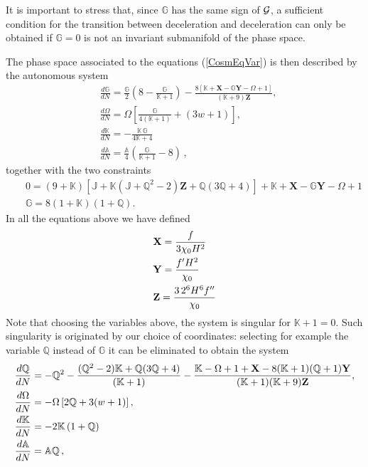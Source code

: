 \documentclass[a4paper,aps,onecolumn,nofootinbib]{revtex4}
\def\rf#1{(\ref{#1})}
\def\DerN#1{\frac{d #1}{d N}}
\def\G{{\cal G}}
\begin{document}
It is important to stress that, since $\mathbb{G}$ has the same sign of $\G$, a sufficient condition for the transition between deceleration and deceleration can only be obtained if $\mathbb{G}=0$ is not an invariant submanifold of the phase space.

The phase space associated to the equations \rf{CosmEqVar} is then described by the autonomous system
\begin{equation}\label{DynSys}
\begin{split}
&\DerN{\mathbb{G}}= \frac{\mathbb{G}}{2}  \left(8-\frac{\mathbb{G}}{\mathbb{K}+1}\right)-\frac{8
   [\mathbb{K}+\mathbf{X}-\mathbb{G} \mathbf{Y}-\Omega +1]}{(\mathbb{K}+9) \mathbf{Z}},\\ 
&\DerN{\Omega} =\Omega  \left[\frac{\mathbb{G}}{4 (\mathbb{K}+1)}+(3 w+1)\right],\\ 
&\DerN{\mathbb{K} }=-\frac{\mathbb{K}\, \mathbb{G} }{4
   \mathbb{K}+4}\\
&\DerN{\mathbb{A}}=\frac{\mathbb{A}}{4}  \left(\frac{\mathbb{G}}{\mathbb{K}+1}-8\right)\,,
\end{split}
\end{equation}
together with the two constraints
\begin{eqnarray}
&& 0=(9+\mathbb{K}) \left[\mathbb{J}+\mathbb{K}
   \left(\mathbb{J}+\mathbb{Q}^2-2\right)\mathbf{Z}+\mathbb{Q} (3
   \mathbb{Q}+4)\right]+\mathbb{K}+\mathbf{X}-\mathbb{G} \mathbf{Y}-\Omega +1  \label{FriedConstr} \\
&&  \mathbb{G}=8(1+\mathbb{\mathbb{K}})(1+\mathbb{Q}).\label{GB Constr}
\end{eqnarray}
 In all the equations above we have defined
\begin{align} \label{XYT}
& {\bf X}= \frac{f}{3 \chi_0 H^2 }\\
&  {\bf Y}= \frac{f' H^2}{\chi_0}\\
& {\bf Z}= \frac{3\, 2^6 H^6  f''}{ \chi_0}
\end{align}
Note that choosing the variables above, the system is singular for $\mathbb{K}+1=0$. Such singularity is originated by our choice of coordinates:  selecting for example the variable $\mathbb{Q}$ instead of $\mathbb{G}$ it can be eliminated to obtain the system
\begin{equation}\label{DynSysQ}
\begin{split}
&\DerN{\mathbb{Q}}=-\mathbb{Q}^2-\frac{ (\mathbb{Q}^2-2) \mathbb{K}+ \mathbb{Q}(3\mathbb{Q}+4)}{(\mathbb{K}+1)}-\frac{\mathbb{K}-\Omega+1+{\bf X}-8 (\mathbb{K}+1) (\mathbb{Q}+1) {\bf Y} }{(\mathbb{K}+1) (\mathbb{K}+9) {\bf Z}},\\ 
&\DerN{\Omega} =-\Omega  \left[2 \mathbb{Q}+3( w+1)\right],\\ 
&\DerN{\mathbb{K} }=-2\mathbb{K}\, (1+\mathbb{Q})\\
&\DerN{\mathbb{A}}=\mathbb{A}\mathbb{Q}\,,
\end{split}
\end{equation}
\end{document}
